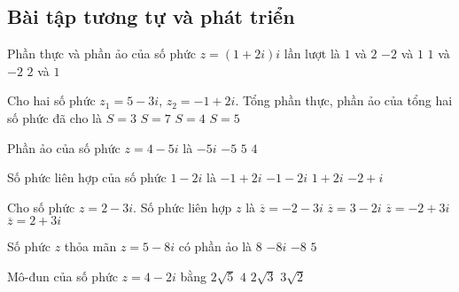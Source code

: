 \subsection{Bài tập tương tự và phát triển}

\begin{ex}%
	Phần thực và phần ảo của số phức $z=(1+2i)i$ lần lượt là
	\choice
	{$1$ và $2$}
	{\True $-2$ và $1$}
	{$1$ và $-2$}
	{$2$ và $1$}
\end{ex}
\begin{ex}%
	Cho hai số phức $z_1=5-3i$, $z_2=-1+2i$. Tổng phần thực, phần ảo của tổng hai số phức đã cho là
	\choice
	{\True $S=3$}
	{$S=7$}
	{$S=4$}
	{$S=5$}
\end{ex}
\begin{ex}%
	Phần ảo của số phức $z=4-5i$ là
	\choice
	{$-5i$}
	{\True $-5$}
	{$5$}
	{$4$}
\end{ex}
\begin{ex}%
	Số phức liên hợp của số phức $1-2i$ là
	\choice
	{$-1+2i$}
	{$-1-2i$}
	{\True $1+2i$}
	{$-2+i$}
\end{ex}
\begin{ex}%
	Cho số phức $z=2-3i$. Số phức liên hợp $z$ là
	\choice
	{$\overline{z}=-2-3i$}
	{$\overline{z}=3-2i$}
	{$\overline{z}=-2+3i$}
	{\True $\overline{z}=2+3i$}
\end{ex}
\begin{ex}%
	Số phức $z$ thỏa mãn $z=5-8i$ có phần ảo là
	\choice
	{$8$}
	{$-8i$}
	{\True $-8$}
	{$5$}
\end{ex}
\begin{ex}%
	Mô-đun của số phức $z=4-2i$ bằng
	\choice
	{\True $2\sqrt{5}$}
	{$4$}
	{$2\sqrt{3}$}
	{$3\sqrt{2}$}
\end{ex}
